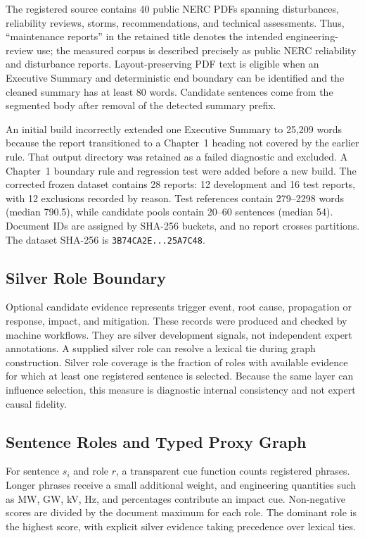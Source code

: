 \documentclass[applsci,article,submit,moreauthors]{Definitions/mdpi}
\begin{document}
The registered source contains 40 public NERC PDFs spanning disturbances, reliability reviews, storms, recommendations, and technical assessments. Thus, ``maintenance reports'' in the retained title denotes the intended engineering-review use; the measured corpus is described precisely as public NERC reliability and disturbance reports. Layout-preserving PDF text is eligible when an Executive Summary and deterministic end boundary can be identified and the cleaned summary has at least 80 words. Candidate sentences come from the segmented body after removal of the detected summary prefix.

An initial build incorrectly extended one Executive Summary to 25,209 words because the report transitioned to a Chapter~1 heading not covered by the earlier rule. That output directory was retained as a failed diagnostic and excluded. A Chapter~1 boundary rule and regression test were added before a new build. The corrected frozen dataset contains 28 reports: 12 development and 16 test reports, with 12 exclusions recorded by reason. Test references contain 279--2298 words (median 790.5), while candidate pools contain 20--60 sentences (median 54). Document IDs are assigned by SHA-256 buckets, and no report crosses partitions. The dataset SHA-256 is \texttt{3B74CA2E...25A7C48}.

\subsection{Silver Role Boundary}

Optional candidate evidence represents trigger event, root cause, propagation or response, impact, and mitigation. These records were produced and checked by machine workflows. They are silver development signals, not independent expert annotations. A supplied silver role can resolve a lexical tie during graph construction. Silver role coverage is the fraction of roles with available evidence for which at least one registered sentence is selected. Because the same layer can influence selection, this measure is diagnostic internal consistency and not expert causal fidelity.

\subsection{Sentence Roles and Typed Proxy Graph}

For sentence $s_i$ and role $r$, a transparent cue function counts registered phrases. Longer phrases receive a small additional weight, and engineering quantities such as MW, GW, kV, Hz, and percentages contribute an impact cue. Non-negative scores are divided by the document maximum for each role. The dominant role is the highest score, with explicit silver evidence taking precedence over lexical ties.
\end{document}
